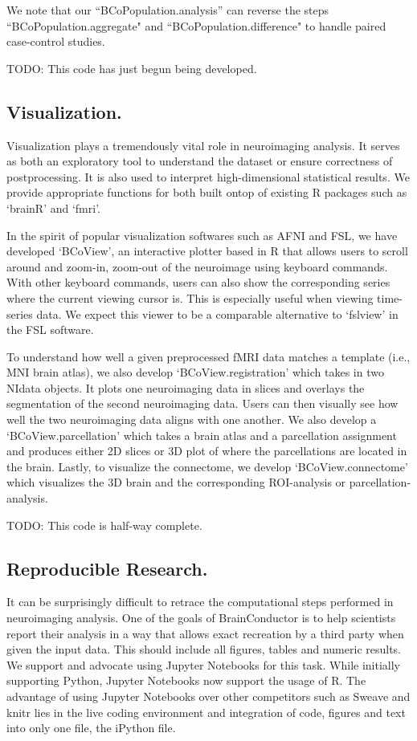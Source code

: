 \documentclass{nature}
\begin{document}
We note that our ``BCoPopulation.analysis'' can reverse the steps
``BCoPopulation.aggregate"
and ``BCoPopulation.difference" to handle paired case-control studies.

{\color{red}TODO: This code has just begun being developed.}

\subsection{Visualization.}
Visualization plays a tremendously vital role in neuroimaging analysis.
It serves as both an exploratory tool to understand the dataset or ensure
correctness
of postprocessing. It is also used to interpret high-dimensional statistical
results.
We provide appropriate functions for both built ontop of existing R packages
such
as `brainR' and `fmri'.

In the spirit of popular visualization softwares such as AFNI and FSL, we have
developed `BCoView', an interactive plotter based in R that allows users to
scroll around and
zoom-in, zoom-out of the neuroimage using keyboard commands. With other keyboard
commands, users can also show the corresponding series where the current
viewing
cursor is. This is especially useful when viewing time-series data. 
We expect this viewer to be a comparable alternative to `fslview' in
the FSL
software.

To understand how well a given preprocessed fMRI data matches a template (i.e.,
MNI brain
atlas), we also develop `BCoView.registration' which takes in two NIdata
objects.
It plots one neuroimaging data in slices and overlays the segmentation of the
second
neuroimaging data. Users can then visually see how well the two neuroimaging
data aligns
with one another. We also develop a `BCoView.parcellation' which takes a brain
atlas and
a parcellation assignment and produces either 2D slices or 3D plot of where the
parcellations
are located in the brain.
Lastly, to visualize the connectome, we develop `BCoView.connectome' which
visualizes the
3D brain and the corresponding ROI-analysis or parcellation-analysis.

{\color{red}TODO: This code is half-way complete.}

\subsection{Reproducible Research.}

It can be surprisingly difficult to retrace the computational steps performed
in neuroimaging analysis. One of the goals of BrainConductor is to help
scientists report their analysis in a way that allows exact recreation by
a third party when given the input data. This should include all figures,
tables and numeric results. We support and advocate using Jupyter Notebooks for
this task. While initially supporting Python, Jupyter Notebooks now support
the usage of R. The advantage of using Jupyter Notebooks over other competitors
such as Sweave and knitr lies in the live coding environment and
integration of code, figures and text into only one file, the iPython file.
\end{document}
